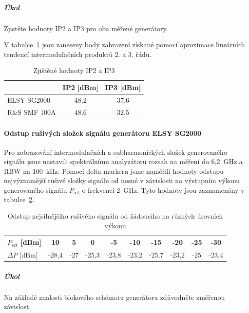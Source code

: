 \documentclass[11pt,a4paper]{article}
\begin{document}
\subparagraph*{Úkol} Zjistěte hodnoty IP2 a IP3 pro oba měřené generátory.

V tabulce~\ref{table:intercept-points} jsou zaneseny body zahrazení získané pomocí aproximace lineárních tendencí intermodulačních produktů 2. a 3. řádu.
\begin{table}[!ht]
\begin{center}
\begin{tabular}{| l || c | c |}
    \hline
    & IP2 [dBm] & IP3 [dBm] \\
    \hline\hline
    ELSY SG2000 & 48,2 & 37,6 \\
    \hline
    R\&S SMF 100A & 48,6 & 32,5 \\
    \hline
\end{tabular}
\caption{Zjištěné hodnoty IP2 a IP3}
\label{table:intercept-points}
\end{center}
\end{table}

\paragraph*{Odstup rušivých složek signálu generátoru ELSY SG2000}
Pro zobrazování intermodulačních a subharmonických složek generovaného signálu jsme nastavili spektrálnímu analyzátoru rozsah na měření do 6,2~GHz a RBW na 100~kHz. Pomocí delta markeru jsme naměřili hodnoty odstupu nejvýznamější rušivé složky signálu od nosné v závislosti na výstupním výkonu generovaného signálu $P_{\mathrm{set}}$ o frekvenci 2~GHz. Tyto hodnoty jsou zaznamenány v tabulce~\ref{table:spurious-signal-distance-ELSY}.

\begin{table}[!ht]
\begin{center}
\begin{tabular}{| l || c | c | c | c | c | c | c | c | c |}
    \hline
    $P_{\mathrm{set}}$ [dBm] & 10 & 5 & 0 & -5 & -10 & -15 & -20 & -25 & -30 \\
    \hline
    $\Delta P$ [dBm] & -28,4 & -27 & -25,3 & -23,8 & -23,2 & -25,7 & -23,2 & -25 & -23,4 \\
    \hline
\end{tabular}
\caption{Odstup nejsilnějšího rušivého signálu od žádoucího na různých úrovních výkonu}
\label{table:spurious-signal-distance-ELSY}
\end{center}
\end{table}

\subparagraph*{Úkol} Na základě znalosti blokového schématu generátoru zdůvodněte změřenou závislost.
\end{document}
